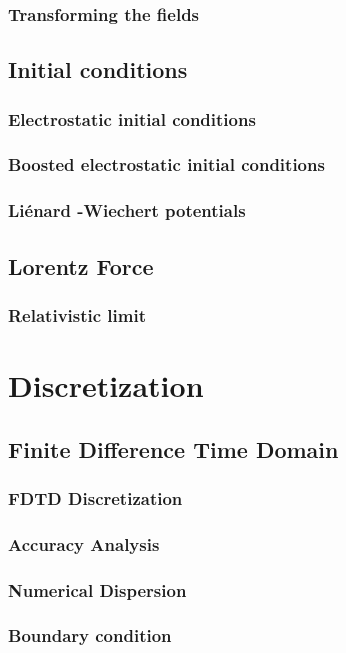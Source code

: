 \documentclass[10pt]{report}
\let\Chapter\chapter
\def\chapter{\addtocontents{lol}{\protect\addvspace{10pt}}\Chapter}
\begin{document}
\subsection{Transforming the fields } \label{transformingthefields}
\section{Initial conditions}
\subsection{Electrostatic initial conditions }
\subsection{Boosted electrostatic initial conditions}
\subsection{Liénard -Wiechert potentials} \label{subsection_lienard}
\section{Lorentz Force}
\subsection{Relativistic limit } \label{relativistic_lorentz_force}
\chapter{Discretization} \label{discretization}
\section{Finite Difference Time Domain}
\subsection{FDTD Discretization}
\subsection{Accuracy Analysis } \label{accuracy_analysis}
\subsection{Numerical Dispersion}
\subsection{Boundary condition } \label{bcond_numeric}
\end{document}

